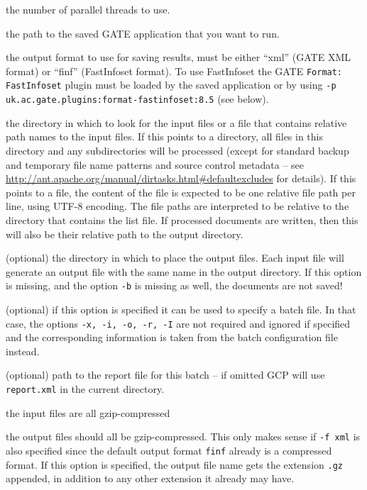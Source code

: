 \bde
\item[-t] the number of parallel threads to use.
\item[-x] the path to the saved GATE application that you want to run.
\item[-f] the output format to use for saving results, must be either ``xml''
  (GATE XML format) or ``finf'' (FastInfoset format).  To use FastInfoset the
  GATE \verb!Format: FastInfoset! plugin must be loaded by the saved
  application or by using \verb!-p uk.ac.gate.plugins:format-fastinfoset:8.5!
  (see below).
\item[-i] the directory in which to look for the input files or a file that contains
  relative path names to the input files. If this points to a directory, all files in
  this directory and any subdirectories will be processed (except for standard
  backup and temporary file name patterns and source control metadata -- see
  \url{http://ant.apache.org/manual/dirtasks.html#defaultexcludes} for
  details). If this points to a file, the content of the file is expected to be 
  one relative file path per line, using UTF-8 encoding. The file paths are 
  interpreted to be relative to the directory that contains the list file.
  If processed documents are written, then this will also be their relative 
  path to the output directory. 
\item[-o] (optional) the directory in which to place the output files.  Each input file
  will generate an output file with the same name in the output directory.
  If this option is missing, and the option \texttt{-b} is missing as well,
  the documents are not saved!
\item[-b] (optional) if this option is specified it can be used to specify
  a batch file. In that case, the options \texttt{-x, -i, -o, -r, -I} are 
  not required and ignored if specified and the corresponding information is
  taken from the batch configuration file instead.
\item[-r] (optional) path to the report file for this batch -- if omitted
  GCP will use \verb!report.xml! in the current directory.
\item[-ci] the input files are all gzip-compressed
\item[-co] the output files should all be gzip-compressed. This only makes
sense if \verb!-f xml! is also specified since the default output format
\verb!finf! already is a compressed format. If this option is specified, the
output file name gets the extension \verb!.gz! appended, in addition to 
any other extension it already may have.
